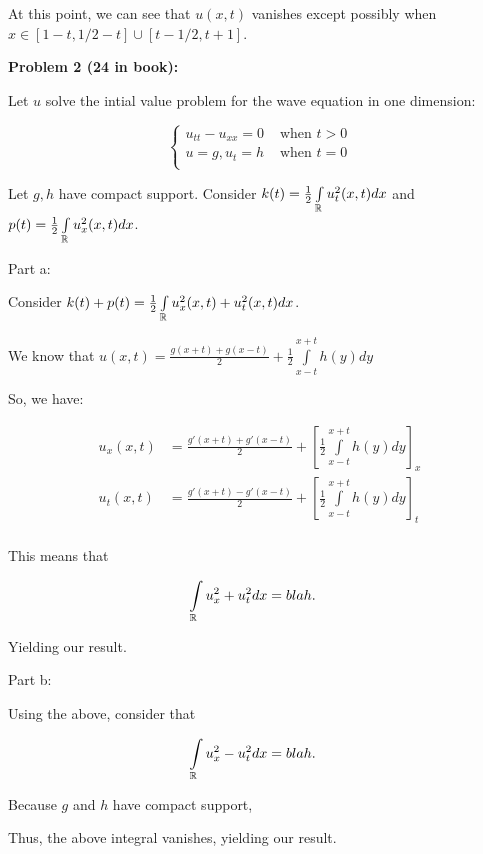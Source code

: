 \documentclass[a4paper,12pt]{article}
\begin{document}
At this point, we can see that $u(x,t)$ vanishes except possibly when $x \in [1-t,1/2-t] \cup [t-1/2, t+1]$. 

\shunt

{\bf Problem 2 (24 in book):}

Let $u$ solve the intial value problem for the wave equation in one dimension:

\begin{displaymath}
   \left\{
     \begin{array}{lr}
       u_{tt} - u_{xx} = 0  & \text{ when } t>0 \\
       u=g, u_t = h & \text{ when } t=0 \\
     \end{array}
   \right.
\end{displaymath}

Let $g,h$ have compact support. Consider $k(t) = \frac{1}{2} \int\limits_{\mathbb{R}} u_t^2(x,t) dx$ and $p(t) = \frac{1}{2} \int\limits_{\mathbb{R}} u_x^2(x,t) dx$.

Part a:

Consider $k(t) + p(t) = \frac{1}{2}\int\limits_{\mathbb{R}} u_x^2(x,t) + u_t^2(x,t) dx$.

We know that $u(x,t) = \frac{g(x+t)+g(x-t)}{2} + \frac{1}{2}\int\limits_{x-t}^{x+t} h(y)dy$

So, we have:

\begin{align*}
u_x(x,t) &= \frac{g'(x+t)+g'(x-t)}{2} + \left[\frac{1}{2}\int\limits_{x-t}^{x+t} h(y)dy\right]_x\\
u_t(x,t) &= \frac{g'(x+t)-g'(x-t)}{2} + \left[\frac{1}{2}\int\limits_{x-t}^{x+t} h(y)dy\right]_t\\
\end{align*}

This means that

\begin{align*}
\int\limits_{\mathbb{R}} u_x^2 + u_t^2 dx &= blah.
\end{align*}

Yielding our result.

\shunt

Part b:

Using the above, consider that 

\begin{align*}
\int\limits_{\mathbb{R}} u_x^2 - u_t^2 dx &= blah.
\end{align*}

Because $g$ and $h$ have compact support, %

Thus, the above integral vanishes, yielding our result.
\end{document}
